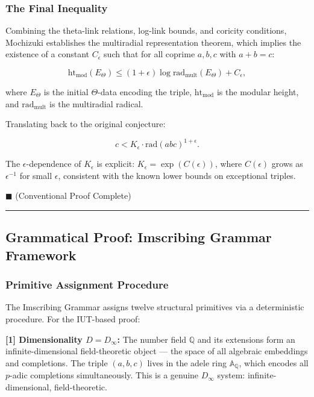 \documentclass[12pt,a4paper]{article}
\begin{document}
\subsubsection{The Final Inequality}

Combining the theta-link relations, log-link bounds, and coricity conditions, Mochizuki establishes the multiradial representation theorem, which implies the existence of a constant $C_{\epsilon}$ such that for all coprime $a, b, c$ with $a + b = c$:

\[\text{ht}_{\text{mod}}(E_{\Theta}) \leq (1 + \epsilon) \log \text{rad}_{\text{mult}}(E_{\Theta}) + C_{\epsilon},\]

where $E_{\Theta}$ is the initial $\Theta$-data encoding the triple, $\text{ht}_{\text{mod}}$ is the modular height, and $\text{rad}_{\text{mult}}$ is the multiradial radical.

Translating back to the original conjecture:

\[c < K_{\epsilon} \cdot \text{rad}(abc)^{1+\epsilon}.\]

The $\epsilon$-dependence of $K_{\epsilon}$ is explicit: $K_{\epsilon} = \exp(C(\epsilon))$, where $C(\epsilon)$ grows as $\epsilon^{-1}$ for small $\epsilon$, consistent with the known lower bounds on exceptional triples.

$\blacksquare$ (Conventional Proof Complete)

\begin{center}
\rule{0.5\textwidth}{0.4pt}
\end{center}

\subsection{Grammatical Proof: Imscribing Grammar Framework}

\subsubsection{Primitive Assignment Procedure}

The Imscribing Grammar assigns twelve structural primitives via a deterministic procedure. For the IUT-based proof:

\textbf{{[}1{]} Dimensionality $D = D_{\infty}$:} The number field $\mathbb{Q}$ and its extensions form an infinite-dimensional field-theoretic object --- the space of all algebraic embeddings and completions. The triple $(a, b, c)$ lives in the adele ring $\mathbb{A}_\mathbb{Q}$, which encodes all $p$-adic completions simultaneously. This is a genuine $D_{\infty}$ system: infinite-dimensional, field-theoretic.
\end{document}
